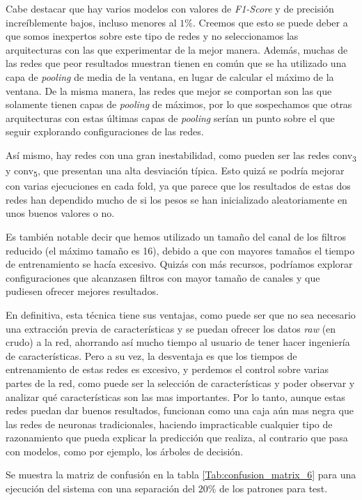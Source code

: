 \documentclass[12pt]{article}
\begin{document}
\bigskip
Cabe destacar que hay varios modelos con valores de \textit{F1-Score} y de precisión increíblemente bajos,
incluso menores al $1\%$. Creemos que esto se puede deber a que somos inexpertos sobre este tipo de redes
y no seleccionamos las arquitecturas con las que experimentar de la mejor manera. Además, muchas de las
redes que peor resultados muestran tienen en común que se ha utilizado una capa de \textit{pooling} de media
de la ventana, en lugar de calcular el máximo de la ventana. De la misma manera, las redes que mejor se comportan
son las que solamente tienen capas de \textit{pooling} de máximos, por lo que sospechamos que otras arquitecturas
con estas últimas capas de \textit{pooling} serían un punto sobre el que seguir explorando configuraciones de las redes.

\bigskip
Así mismo, hay redes con una gran inestabilidad, como pueden ser las redes conv\textsubscript{3} y
conv\textsubscript{5}, que presentan una alta desviación típica. Esto quizá se podría mejorar con
varias ejecuciones en cada fold, ya que parece que los resultados de estas dos redes han dependido
mucho de si los pesos se han inicializado aleatoriamente en unos buenos valores o no.

\bigskip
Es también notable decir que hemos utilizado un tamaño del canal de los filtros reducido (el máximo tamaño es 16),
debido a que con mayores tamaños el tiempo de entrenamiento se hacía excesivo. Quizás con más recursos,
podríamos explorar configuraciones que alcanzasen filtros con mayor tamaño de canales y que pudiesen
ofrecer mejores resultados.

\bigskip
En definitiva, esta técnica tiene sus ventajas, como puede ser que no sea necesario una extracción previa
de características y se puedan ofrecer los datos \textit{raw} (en crudo) a la red, ahorrando así mucho tiempo
al usuario de tener hacer ingeniería de características. Pero a su vez, la desventaja es que los tiempos de entrenamiento
de estas redes es excesivo, y perdemos el control sobre varias partes de la red, como puede ser la selección de
características y poder observar y analizar qué características son las mas importantes. Por lo tanto,
aunque estas redes puedan dar buenos resultados, funcionan como una caja aún mas negra que las redes de neuronas
tradicionales, haciendo impracticable cualquier tipo de razonamiento que pueda explicar la predicción que realiza,
al contrario que pasa con modelos, como por ejemplo, los árboles de decisión.

\bigskip
Se muestra la matriz de confusión en la tabla \ref{Tab:confusion_matrix_6} para una ejecución del sistema
con una separación del $20\%$ de los patrones para test.
\end{document}
